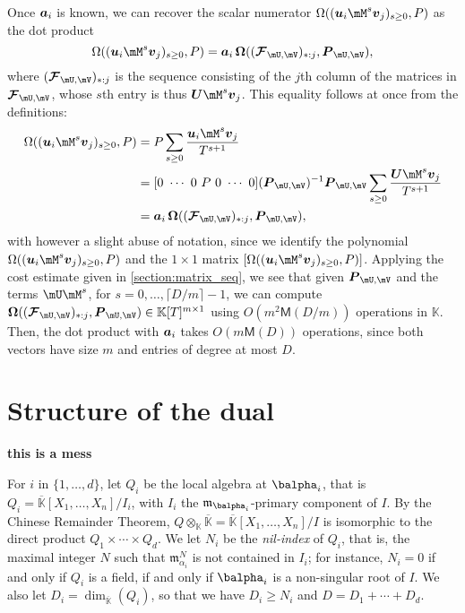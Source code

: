 \documentclass[12pt]{article}
\newcommand{\mat}[1]{\bm{\MakeUppercase{#1}}} %
\newcommand{\row}[1]{\bm{\MakeLowercase{#1}}} %
\newcommand{\col}[1]{\bm{\MakeLowercase{#1}}} %
\newcommand{\seq}{\mat{\mathcal{F}}} %
\newcommand{\minpoly}{P}
\def\M {\ensuremath{\mathsf{M}}}
\def\K{\mathbb{K}}
\def\K {\ensuremath{\mathbb{K}}}
\def\Kbar {{\ensuremath{\overline{\mathbb{K}}}}}
\def\D {\ensuremath{D}}
\def\m {\ensuremath{\mathfrak{m}}}
\begin{document}
Once $\row{a}_i$ is known, we can recover the scalar numerator
$\Omega((\row{u}_i \mM^s \col{v}_j)_{s \ge 0}, \minpoly)$ as
the dot product
$$\Omega((\row{u}_i \mM^s \col{v}_j)_{s \ge 0}, \minpoly) = \row{a}_i\, \mat{\Omega}( (\seq_{\mU,\mV})_{*:j}, \mat{P}_{\mU,\mV}),$$
where $(\seq_{\mU,\mV})_{*:j}$ is the sequence consisting 
of the $j$th column of the matrices in $\seq_{\mU,\mV}$,
whose $s$th entry is thus $\mat{U} \mM^s \col{v}_j$.
This equality follows at once from the definitions:
\begin{align*}
  \Omega((\row{u}_i \mM^s \col{v}_j)_{s \ge 0}, \minpoly)  &= \minpoly \sum_{s \ge 0} \frac{\row{u}_i \mM^s \col{v}_j}{T^{s+1}}\\
&=  [0~\cdots~0~\minpoly~0~\cdots~0] (\mat{P}_{\mU,\mV})^{-1} \mat{P}_{\mU,\mV} \sum_{s \ge 0} \frac{\mat{U} \mM^s \col{v}_j}{T^{s+1}}\\
&=  \row{a}_i\, \mat{\Omega}( (\seq_{\mU,\mV})_{*:j}, \mat{P}_{\mU,\mV}),
\end{align*}
with however a slight abuse of notation, since we identify the polynomial
$  \Omega((\row{u}_i \mM^s \col{v}_j)_{s \ge 0}, \minpoly)$ 
and the $1 \times 1$ matrix $[  \Omega((\row{u}_i \mM^s \col{v}_j)_{s \ge 0}, \minpoly)]$.
Applying the cost estimate given in \cref{section:matrix_seq}, we see
that given $\mat{P}_{\mU,\mV}$ and
the terms $\mU \mM^s$, for $s=0,\dots,\lceil D/m
\rceil-1$, we can compute $\mat{\Omega}( (\seq_{\mU,\mV})_{*:j}, \mat{P}_{\mU,\mV}) \in \K[T]^{m \times 1}$
using $O(m^2 \M(D/m))$ operations in $\K$. Then, the
dot product with $\row{a}_i$ takes $O(m \M(D))$ operations,
since both vectors have size $m$ and entries of degree at most $D$.


\section{Structure of the dual}

{\bf this is a mess}

For $i$ in $\{1,\dots,d\}$, let $Q_i$ be the local algebra at
$\balpha_i$, that is $Q_i=\Kbar[X_1,\dots,X_n]/I_i$, with $I_i$ the
$\m_{\balpha_i}$-primary component of $I$. By the Chinese Remainder
Theorem, $Q\otimes_\K \Kbar=\Kbar[X_1,\dots,X_n]/I$ is isomorphic to
the direct product $Q_1\times \cdots \times Q_d$.  We let $N_i$ be the
{\em nil-index} of $Q_i$, that is, the maximal integer $N$ such that
$\m_{\alpha_i}^N$ is not contained in $I_i$; for instance, $N_i=0$ if
and only if $Q_i$ is a field, if and only if $\balpha_i$ is a
non-singular root of $I$. We also let
$\D_i=\dim_\Kbar(Q_i)$, so that we have $D_i \ge N_i$ and $\D=\D_1 + \cdots + \D_d$.
\end{document}
